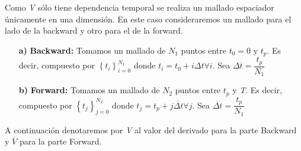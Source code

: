 \documentclass[titlepage]{article}
\begin{document}
\vspace{5pt}
Como \textit{V} sólo tiene dependencia temporal se realiza un mallado espaciador únicamente en una dimensión. En este caso consideraremos un mallado para el lado de la backward y otro para el de la forward.

\begin{itemize}
	\item[\textbf{a)}] \textbf{Backward:} Tomamos un mallado de $N_{1}$ puntos entre $t_{0} = 0$ y $t_{p}$. Es decir, compuesto por $\left\lbrace t_{i} \right\rbrace_{i = 0}^{N_{1}}$ donde $t_{i} = t_{0} + i \Delta t \forall i$. Sea $\Delta t = \dfrac{t_{p}}{N_{1}}$ 
	
	\item[\textbf{b)}] \textbf{Forward:} Tomamos un mallado de $N_{2}$ puntos entre $t_{p}$ y \textit{T}. Es decir, compuesto por $\left\lbrace t_{j} \right\rbrace_{j = 0}^{N_{2}}$ donde $t_{j} = t_{p} + j \overline{\Delta t} \forall j$. Sea $\overline{\Delta t} = \dfrac{t_{p}}{N_{1}}$ 
\end{itemize}

A continuación denotaremos por \textit{V} al valor del derivado para la parte Backward y $\overline{V}$ para la parte Forward.
\end{document}
